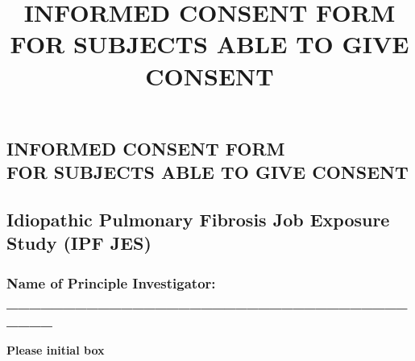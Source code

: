 \documentclass[a4paper,10pt]{article}
\begin{document}
 \newpage\title{\bf INFORMED CONSENT FORM FOR SUBJECTS ABLE TO GIVE CONSENT}
 \date{}
 
 
 \pagestyle{fancy}
 
 
 \begin{centering} 
 \section*{INFORMED CONSENT FORM \\ FOR SUBJECTS ABLE TO GIVE CONSENT}
 \end{centering}

 \subsection*{Idiopathic Pulmonary Fibrosis Job Exposure Study (IPF JES)}

 \vspace{0.2cm}

 \subsubsection*{Name of Principle Investigator: \_\_\_\_\_\_\_\_\_\_\_\_\_\_\_\_\_\_\_\_\_\_\_\_\_\_\_\_\_\_\_\_\_\_\_\_\_\_\_}

 \vspace{0.6cm}

 \hfill \textbf{Please initial box}
\end{document}
